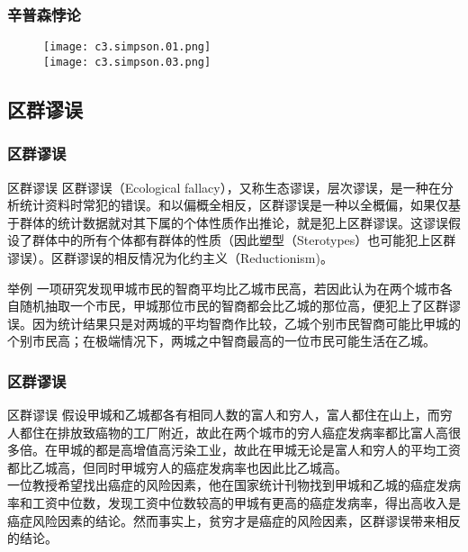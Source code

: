 \begin{frame}
  \frametitle{辛普森悖论}
  \begin{figure}
    \centering
    \texttt{[image: c3.simpson.01.png]}\\
    \texttt{[image: c3.simpson.03.png]}
  \end{figure}
\end{frame}

\subsection{区群谬误}
\begin{frame}
  \frametitle{区群谬误}
  \begin{block}{区群谬误}
    区群谬误（Ecological fallacy），又称生态谬误，层次谬误，是一种在分析统计资料时常犯的错误。和以偏概全相反，区群谬误是一种以全概偏，如果仅基于群体的统计数据就对其下属的个体性质作出推论，就是犯上区群谬误。这谬误假设了群体中的所有个体都有群体的性质（因此塑型（Sterotypes）也可能犯上区群谬误）。区群谬误的相反情况为化约主义（Reductionism)。
  \end{block}
  \pause
  \begin{block}{举例}
一项研究发现甲城市民的智商平均比乙城市民高，若因此认为在两个城市各自随机抽取一个市民，甲城那位市民的智商都会比乙城的那位高，便犯上了区群谬误。因为统计结果只是对两城的平均智商作比较，乙城个别市民智商可能比甲城的个别市民高；在极端情况下，两城之中智商最高的一位市民可能生活在乙城。
  \end{block}
\end{frame}

\begin{frame}
  \frametitle{区群谬误}
  \begin{block}{区群谬误}
假设甲城和乙城都各有相同人数的富人和穷人，富人都住在山上，而穷人都住在排放致癌物的工厂附近，故此在两个城市的穷人癌症发病率都比富人高很多倍。在甲城的都是高增值高污染工业，故此在甲城无论是富人和穷人的平均工资都比乙城高，但同时甲城穷人的癌症发病率也因此比乙城高。\\
\vspace{1em}
一位教授希望找出癌症的风险因素，他在国家统计刊物找到甲城和乙城的癌症发病率和工资中位数，发现工资中位数较高的甲城有更高的癌症发病率，得出高收入是癌症风险因素的结论。然而事实上，贫穷才是癌症的风险因素，区群谬误带来相反的结论。
  \end{block}
\end{frame}


